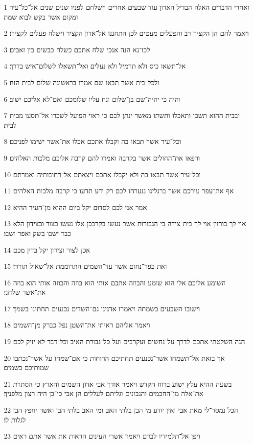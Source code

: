 \par 1 ואחרי הדברים האלה הבדיל האדון עוד שבעים אחרים וישלחם לפניו שנים שנים אל־כל־עיר ומקום אשר בקש לבוא שמה׃
\par 2 ויאמר להם הן הקציר רב והפעלים מעטים לכן התחננו אל־אדון הקציר וישלח פעלים לקצירו׃
\par 3 לכו־נא הנה אנכי שלח אתכם כשלח כבשים בין זאבים׃
\par 4 אל־תשאו כיס ולא תרמיל ולא נעלים ואל־תשאלו לשלום־איש בדרך׃
\par 5 ולכל־בית אשר תבאו שם אמרו בראשונה שלום לבית הזה׃
\par 6 והיה כי יהיה־שם בן־שלום ונח עליו שלומכם ואם־לא אליכם ישוב׃
\par 7 ובבית ההוא תשבו ותאכלו ותשתו מאשר ינתן לכם כי ראוי הפועל לשכרו אל־תסעו מבית לבית׃
\par 8 וכל־עיר אשר תבאו בה וקבלו אתכם אכלו את־אשר ישימו לפניכם׃
\par 9 ורפאו את־החולים אשר בקרבה ואמרו להם קרבה אליכם מלכות האלהים׃
\par 10 וכל־עיר אשר תבאו בה ולא יקבלו אתכם ויצאתם אל־רחובותיה ואמרתם׃
\par 11 אף את־עפר עירכם אשר ברגלינו ננערהו לכם רק ידע תדעו כי קרבה מלכות האלהים׃
\par 12 אמר אני לכם לסדום יקל ביום ההוא מן־העיר ההיא׃
\par 13 אוי לך כורזין אוי לך בית־צידה כי הגבורות אשר נעשו בקרבכן אלו נעשו בצור ובצידון הלא כבר ישבו בשק ואפר ושבו׃
\par 14 אכן לצור וצידון יקל בדין מכם׃
\par 15 ואת כפר־נחום אשר עד־השמים התרוממת אל־שאול תורדי׃
\par 16 השומע אליכם אלי הוא שומע והבוזה אתכם אותי הוא בוזה והבוזה אותי הוא בוזה את־אשר שלחני׃
\par 17 וישובו השבעים בשמחה ויאמרו אדנינו גם־השדים נכנעים תחתינו בשמך׃
\par 18 ויאמר אליהם ראיתי את־השטן נפל כברק מן־השמים׃
\par 19 הנה השלטתי אתכם לדרך על־נחשים ועקרבים ועל כל־גבורת האיב וכל־דבר לא יזיק לכם׃
\par 20 אך בזאת אל־תשמחו אשר־נכנעים תחתיכם הרוחות כי אם־שמחו על אשר־נכתבו שמותיכם בשמים׃
\par 21 בשעה ההיא עלץ ישוע ברוח הקדש ויאמר אודך אבי אדון השמים והארץ כי הסתרת את־אלה מן־החכמים והנבונים וגליתם לעללים הן אבי כי־כן היה רצון מלפניך׃
\par 22 הכל נמסר־לי מאת אבי ואין יודע מי הבן בלתי האב ומי האב בלתי הבן ואשר יחפץ הבן לגלות לו׃
\par 23 ויפן אל־תלמידיו לבדם ויאמר אשרי העינים הראות את אשר אתם ראים׃
